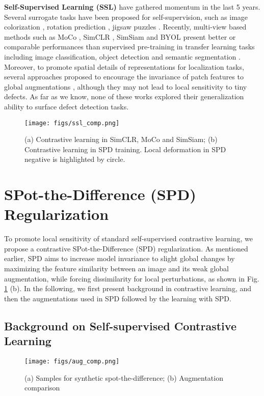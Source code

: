 \noindent\textbf{Self-Supervised Learning (SSL)} have gathered momentum in the last 5 years. Several surrogate tasks have been proposed for self-supervision, such as image colorization \cite{zhang2016colorful}, rotation prediction \cite{gidaris2018unsupervised}, jigsaw puzzles \cite{noroozi2016unsupervised}. Recently, multi-view based methods such as MoCo \cite{he2020momentum}, SimCLR \cite{chen2020simple}, SimSiam \cite{chen2021exploring} and BYOL \cite{grill2020bootstrap} present better or comparable performances than supervised pre-training in transfer learning tasks including image classification, object detection \cite{Yang_2021_CVPR} and semantic segmentation \cite{wang2021dense}. Moreover, to promote spatial details of representations for localization tasks, several approaches proposed to encourage the invariance of patch features to global augmentations \cite{wang2021dense,xie2021detco,liu2020self,chen2021multisiam}, although they may not lead to local sensitivity to tiny defects. As far as we know, none of these works explored their generalization ability to surface defect detection tasks. 

\begin{figure}[!t]
 \centering
\texttt{[image: figs/ssl\_comp.png]}
\caption{(a) Contrastive learning in SimCLR, MoCo and SimSiam; (b) Contrastive learning in SPD training. Local deformation in SPD negative is highlighted by circle.}
\label{fig:ssl_comp}
\end{figure}

\section{SPot-the-Difference (SPD) Regularization}
To promote local sensitivity of standard self-supervised contrastive learning, we propose a contrastive SPot-the-Difference (SPD) regularization. As mentioned earlier, SPD aims to increase model invariance to slight global changes by maximizing the feature similarity between an image and its weak global augmentation, while forcing dissimilarity for local perturbations, as shown in Fig. \ref{fig:ssl_comp} (b). In the following, we first present background in contrastive learning, and then the augmentations used in SPD followed by the learning with SPD.
\subsection{Background on Self-supervised Contrastive Learning}
\begin{figure}[!t]
\centering
\texttt{[image: figs/aug\_comp.png]}
\caption{(a) Samples for synthetic spot-the-difference; (b) Augmentation comparison}
\label{fig:aug_compare}
\end{figure}

